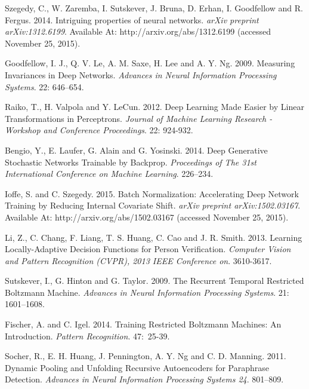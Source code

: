\documentclass[12pt,notitlepage]{article}
\begin{document}
\begin{thebibliography}{10}
{Szegedy, C., 
W. Zaremba,
I. Sutskever, 
J. Bruna, 
D. Erhan, 
I. Goodfellow and 
R. Fergus.}
2014. Intriguing properties of neural networks.  \emph{arXiv preprint arXiv:1312.6199}. Available At: http://arxiv.org/abs/1312.6199 (accessed November 25, 2015).

{Goodfellow, I. J., Q. V. Le, A. M. Saxe, H. Lee and A. Y. Ng.}
2009. Measuring Invariances in Deep Networks. \emph{Advances in Neural Information Processing Systems}. 22: 646--654.


{Raiko, T., H. Valpola and Y. LeCun.}
2012. Deep Learning Made Easier by Linear Transformations in
Perceptrons. \emph{Journal of Machine Learning Research - Workshop and Conference Proceedings}. 22: 924-932.

{Bengio, Y., E. Laufer, G. Alain and G. Yosinski. }
2014. Deep Generative Stochastic Networks Trainable by Backprop. \emph{Proceedings of The 31st International Conference on Machine Learning}. 226–234.


{Ioffe, S. and C. Szegedy.}
2015. Batch Normalization: Accelerating Deep Network Training by Reducing Internal Covariate Shift. \emph{arXiv preprint arXiv:1502.03167}. Available At: http://arxiv.org/abs/1502.03167 (accessed November 25, 2015).

{Li, Z., C. Chang, F. Liang, T. S. Huang, C. Cao and J. R. Smith.}
2013. Learning Locally-Adaptive Decision Functions for Person Verification. \emph{Computer Vision and Pattern Recognition (CVPR), 2013 IEEE Conference on}. 3610-3617.

{Sutskever, I., G. Hinton and G. Taylor.}
2009. The Recurrent Temporal Restricted Boltzmann
Machine. \emph{Advances in Neural Information Processing Systems}. 21: 1601--1608.

 {Fischer, A. and C. Igel.}
2014. Training Restricted Boltzmann Machines: An Introduction. \emph{Pattern Recognition}. 47:~25-39.

{Socher, R., E. H. Huang, J. Pennington, A. Y. Ng and C. D. Manning. }
2011. Dynamic Pooling and Unfolding Recursive Autoencoders for Paraphrase Detection. \emph{Advances in Neural Information Processing Systems 24}. 801--809.




\end{thebibliography}
\end{document}
